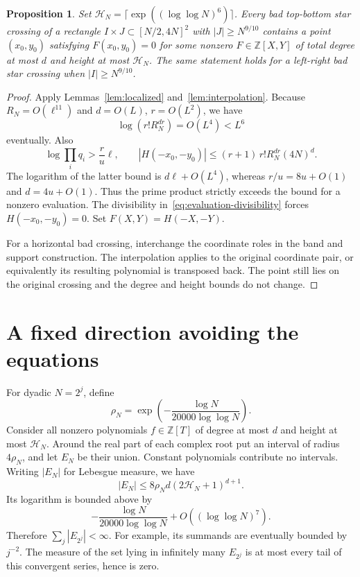 \documentclass[11pt]{article}
\newtheorem{proposition}[theorem]{Proposition}
\theoremstyle{definition}
\theoremstyle{remark}
\newcommand{\ZZ}{\mathbb Z}
\begin{document}
\begin{proposition}\label{prop:algebraic-point}
Set $\mathcal H_N=\lceil\exp((\log\log N)^6)\rceil$.
Every bad top-bottom star crossing of a rectangle
$I\times J\subset[N/2,4N]^2$ with $|J|\geq N^{9/10}$ contains a point
$(x_0,y_0)$ satisfying $F(x_0,y_0)=0$ for some nonzero
$F\in\ZZ[X,Y]$ of total degree at most $d$ and height at most
$\mathcal H_N$. The same statement holds for a left-right bad star crossing
when $|I|\geq N^{9/10}$.
\end{proposition}
\begin{proof}
Apply Lemmas~\ref{lem:localized} and~\ref{lem:interpolation}.
Because $R_N=O(\ell^{11})$ and $d=O(L)$, $r=O(L^2)$, we have
\begin{equation}\label{eq:coefficient-size}
             \log(r!R_N^{dr})=O(L^4)<L^6
\end{equation}
eventually. Also
\[
 \log\prod_iq_i>\frac r u\ell,\qquad
 |H(-x_0,-y_0)|\leq(r+1)\,r!R_N^{dr}(4N)^d.
\]
The logarithm of the latter bound is $d\ell+O(L^4)$, whereas
$r/u=8u+O(1)$ and $d=4u+O(1)$.
Thus the prime product strictly exceeds the bound for a nonzero evaluation.
The divisibility in~\eqref{eq:evaluation-divisibility} forces
$H(-x_0,-y_0)=0$. Set $F(X,Y)=H(-X,-Y)$.

For a horizontal bad crossing, interchange the coordinate roles in the
band and support construction. The interpolation applies to the original
coordinate pair, or equivalently its resulting polynomial is transposed
back. The point still lies on the original crossing and the degree and
height bounds do not change.
\end{proof}

\section{A fixed direction avoiding the equations}

For dyadic $N=2^j$, define
\begin{equation}\label{eq:rho}
             \rho_N=\exp\left(-\frac{\log N}{20000\log\log N}\right).
\end{equation}
Consider all nonzero polynomials $f\in\ZZ[T]$ of degree at most $d$ and
height at most $\mathcal H_N$. Around the real part of each complex root
put an interval of radius $4\rho_N$, and let $E_N$ be their union.
Constant polynomials contribute no intervals. Writing $|E_N|$ for
Lebesgue measure, we have
\begin{equation}\label{eq:exception-measure}
 |E_N|\leq8\rho_Nd(2\mathcal H_N+1)^{d+1}.
\end{equation}
Its logarithm is bounded above by
\[
              -\frac{\log N}{20000\log\log N}+O((\log\log N)^7).
\]
Therefore $\sum_j|E_{2^j}|<\infty$. For example, its summands are
eventually bounded by $j^{-2}$. The measure of the set lying in infinitely
many $E_{2^j}$ is at most every tail of this convergent series, hence is zero.
\end{document}
